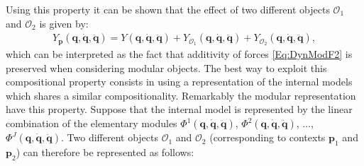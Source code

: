\documentclass{svmult}
\begin{document}
Using this property it can be shown that the effect of 
two different objects $\mathcal O_1$ and $\mathcal O_2$ is
given by:
\begin{eqnarray} \label{Eq:DynModAdditivityO}
Y_{\mathbf p}(\mathbf q, \dot{\mathbf q}, \ddot{\mathbf q}) =
Y(\mathbf q, \dot{\mathbf q}, \ddot{\mathbf q}) + 
Y_{\mathcal O_1}(\mathbf q, \dot{\mathbf q}, \ddot{\mathbf q})
+Y_{\mathcal O_2}(\mathbf q, \dot{\mathbf q}, \ddot{\mathbf q}),
\end{eqnarray}
which can be interpreted as the fact that additivity of forces 
\eqref{Eq:DynModF2} is preserved when considering modular objects. 
The best way to exploit this compositional property consists 
in using a representation of the internal models which shares a similar 
compositionality. Remarkably the modular representation
have this property. Suppose that the internal model is represented
by the linear combination of the elementary modules $\Phi^1(\mathbf q, 
\dot{\mathbf q}, \ddot{\mathbf q})$, $\Phi^2(\mathbf q, \dot{\mathbf q},
\ddot{\mathbf q})$, $\dots$, $\Phi^J(\mathbf q, \dot{\mathbf q},
\ddot{\mathbf q})$. Two different objects $\mathcal O_1$ and $\mathcal O_2$ 
(corresponding to contexts $\mathbf p_1$ and $\mathbf p_2$) can therefore be represented as follows: 
\end{document}
